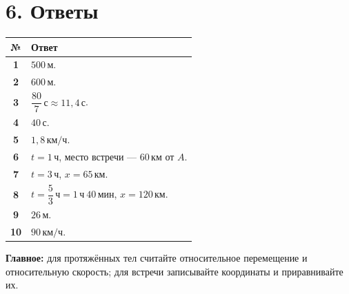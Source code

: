 \documentclass[a4paper,12pt]{article}
\newcommand{\sectionline}{\par\vspace{2mm}{\color{accent}\hrule height 0.7pt}\vspace{3mm}}
\newcommand{\unit}[1]{\,\text{#1}}
\begin{document}
\clearpage
\section*{6. Ответы}
\sectionline
\renewcommand{\arraystretch}{1.35}
\begin{tabularx}{\linewidth}{@{}>{\bfseries}c X@{}}
\toprule
№ & Ответ \\
\midrule
1 & \(500\unit{м}\). \\
2 & \(600\unit{м}\). \\
3 & \(\dfrac{80}{7}\unit{с}\approx11{,}4\unit{с}\). \\
4 & \(40\unit{с}\). \\
5 & \(1{,}8\unit{км/ч}\). \\
6 & \(t=1\unit{ч}\), место встречи --- \(60\unit{км}\) от \(A\). \\
7 & \(t=3\unit{ч}\), \(x=65\unit{км}\). \\
8 & \(t=\dfrac{5}{3}\unit{ч}=1\unit{ч}\ 40\unit{мин}\), \(x=120\unit{км}\). \\
9 & \(26\unit{м}\). \\
10 & \(90\unit{км/ч}\). \\
\bottomrule
\end{tabularx}

\vfill
{\small\color{textgray}\textbf{Главное:} для протяжённых тел считайте относительное перемещение и относительную скорость; для встречи записывайте координаты и приравнивайте их.}
\end{document}
